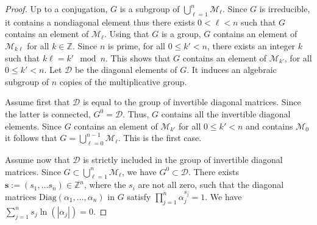 \documentclass[a4paper,11pt]{amsart}
\renewcommand{\leq}{\leqslant}
\def\bn{\mathbf{s}}
\begin{document}
\begin{proof}
Up to a conjugation, $G$ is a subgroup of $ \displaystyle \bigcup_{\ell=1}^{n} \mathcal{M}_{\ell}$. 
Since $G$ is irreducible, it contains a nondiagonal element thus there exists $0<\ell<n$ such that $G$ contains an element of $\mathcal{M}_{\ell}$.  Using that $G$ is a group, $G$ contains an element of $\mathcal{M}_{k\ell}$ for all $k\in\mathbb{Z}$. Since $n$ is prime,   for all $0\leq k'<n$, there exists an integer $k$ such that $k\ell= k' \mod n$. This shows that $G$ contains an element of $\mathcal{M}_{k'}$, for all $0\leq k' <n$. 
Let $\mathcal{D}$ be the diagonal elements of $G$.  It induces an algebraic subgroup of $n$ copies of the multiplicative group.  

Assume first that $\mathcal{D}$ is equal to the group of invertible diagonal matrices.  Since the latter is connected,   $G^0=\mathcal{D}$. 
Thus, $G$ contains all the invertible diagonal elements. Since $G$ contains an element of $\mathcal{M}_{k'}$ for all $0\leq k' <n$ and contains $\mathcal{M}_0$ it follows that $G= \displaystyle \bigcup_{\ell=0}^{n-1} \mathcal{M}_{\ell}$.  This is the first case. 

\medskip
 
Assume now that $\mathcal{D}$ is strictly included in the group of invertible diagonal matrices. Since $G\subset  \displaystyle \bigcup_{\ell=1}^{n} \mathcal{M}_{\ell}$, we have $G^0\subset \mathcal{D}$. There exists $\bn:=(s_1,\dots s_n)\in\mathbb{Z}^n$, where the $s_i$ are not all zero, such that the diagonal matrices $\mathrm{Diag}(\alpha_{1},\dots, \alpha_n)$ in $G$ satisfy $\prod\limits_{j=1}^n \alpha_j^{s_j}=1$.   We have $\sum_{j=1}^{n}s_j \ln(|\alpha_j|)=0$. 


\end{proof}
\end{document}
